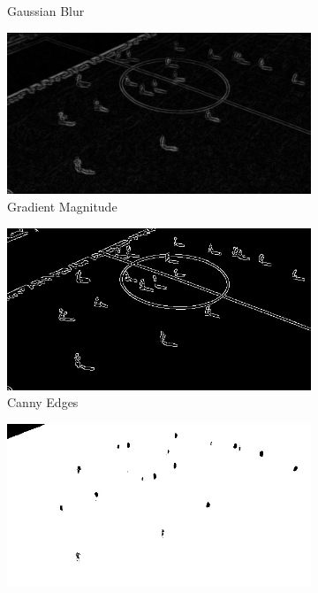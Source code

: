 \documentclass[10pt,twocolumn,letterpaper]{article}
\begin{document}
\begin{figure}[t]
\begin{subfigure}[b]{0.48\linewidth}
    \caption{Gaussian Blur}
  \end{subfigure}
  \begin{subfigure}[b]{0.48\linewidth}
    \centering
    \includegraphics[width=\linewidth]{../edge_detection_steps/03_gradient_magnitude.jpg}
    \caption{Gradient Magnitude}
  \end{subfigure}
  \begin{subfigure}[b]{0.48\linewidth}
    \centering
    \includegraphics[width=\linewidth]{../edge_detection_steps/04_canny_edges.jpg}
    \caption{Canny Edges}
  \end{subfigure}
  \begin{subfigure}[b]{0.48\linewidth}
    \centering
    \includegraphics[width=\linewidth]{../edge_detection_steps/05_field_mask.jpg}

\end{subfigure}
\end{figure}
\end{document}
